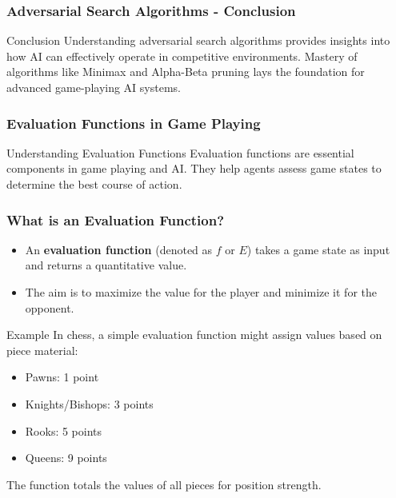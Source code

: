\documentclass[aspectratio=169]{beamer}
\begin{document}
\begin{frame}[fragile]
    \frametitle{Adversarial Search Algorithms - Conclusion}
    \begin{block}{Conclusion}
        Understanding adversarial search algorithms provides insights into how AI can effectively operate in competitive environments. Mastery of algorithms like Minimax and Alpha-Beta pruning lays the foundation for advanced game-playing AI systems.
    \end{block}
\end{frame}

\begin{frame}[fragile]
    \frametitle{Evaluation Functions in Game Playing}
    \begin{block}{Understanding Evaluation Functions}
        Evaluation functions are essential components in game playing and AI.
        They help agents assess game states to determine the best course of action.
    \end{block}
\end{frame}

\begin{frame}[fragile]
    \frametitle{What is an Evaluation Function?}
    \begin{itemize}
        \item An \textbf{evaluation function} (denoted as $f$ or $E$) 
        takes a game state as input and returns a quantitative value.
        \item The aim is to maximize the value for the player and minimize it for the opponent.
    \end{itemize}
    \begin{block}{Example}
        In chess, a simple evaluation function might assign values based on piece material:
        \begin{itemize}
            \item Pawns: 1 point
            \item Knights/Bishops: 3 points
            \item Rooks: 5 points
            \item Queens: 9 points
        \end{itemize}
        The function totals the values of all pieces for position strength.
    \end{block}
\end{frame}
\end{document}
